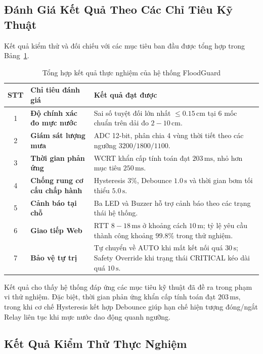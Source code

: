 \subsection{Đánh Giá Kết Quả Theo Các Chỉ Tiêu Kỹ Thuật}

Kết quả kiểm thử và đối chiếu với các mục tiêu ban đầu được tổng hợp trong Bảng~\ref{tab:target_evaluation}.

\begin{table}[H]
\centering
\small
\renewcommand{\arraystretch}{1.25}
\caption{Tổng hợp kết quả thực nghiệm của hệ thống FloodGuard}
\label{tab:target_evaluation}
\begin{tabularx}{\textwidth}{|c|>{\raggedright\arraybackslash\bfseries}p{4.0cm}|X|}
\hline
\textbf{STT} & \textbf{Chỉ tiêu đánh giá} & \textbf{Kết quả đạt được} \\ \hline
1 & Độ chính xác đo mực nước & Sai số tuyệt đối lớn nhất $\le 0.15\,\text{cm}$ tại 6 mốc chuẩn trên dải đo $2 - 10\,\text{cm}$. \\ \hline
2 & Giám sát lượng mưa & ADC 12-bit, phân chia 4 vùng thời tiết theo các ngưỡng $3200 / 1800 / 1100$. \\ \hline
3 & Thời gian phản ứng & WCRT khẩn cấp tính toán đạt $203\,\text{ms}$, nhỏ hơn mục tiêu $250\,\text{ms}$. \\ \hline
4 & Chống rung cơ cấu chấp hành & Hysteresis $3\%$, Debounce $1.0\,\text{s}$ và thời gian bơm tối thiểu $5.0\,\text{s}$. \\ \hline
5 & Cảnh báo tại chỗ & Ba LED và Buzzer hỗ trợ cảnh báo theo các trạng thái hệ thống. \\ \hline
6 & Giao tiếp Web & RTT $8 - 18\,\text{ms}$ ở khoảng cách $10\,\text{m}$; tỷ lệ yêu cầu thành công khoảng $99.8\%$ trong thử nghiệm. \\ \hline
7 & Bảo vệ tự trị & Tự chuyển về AUTO khi mất kết nối quá $30\,\text{s}$; Safety Override khi trạng thái CRITICAL kéo dài quá $10\,\text{s}$. \\ \hline
\end{tabularx}
\end{table}

Kết quả cho thấy hệ thống đáp ứng các mục tiêu kỹ thuật đã đề ra trong phạm vi thử nghiệm. Đặc biệt, thời gian phản ứng khẩn cấp tính toán đạt $203\,\text{ms}$, trong khi cơ chế Hysteresis kết hợp Debounce giúp hạn chế hiện tượng đóng/ngắt Relay liên tục khi mực nước dao động quanh ngưỡng.

\subsection{Kết Quả Kiểm Thử Thực Nghiệm}

